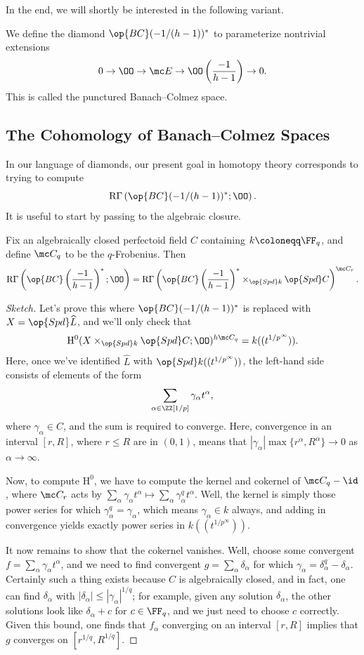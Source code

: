 \documentclass[../notes.tex]{subfiles}
\begin{document}
In the end, we will shortly be interested in the following variant.
\begin{notation}
	We define the diamond $\op{BC}(-1/(h-1))^*$ to parameterize nontrivial extensions
	\[0\to\OO\to\mc E\to\OO\left(\frac{-1}{h-1}\right)\to0.\]
	This is called the punctured Banach--Colmez space.
\end{notation}

\subsection{The Cohomology of Banach--Colmez Spaces}
In our language of diamonds, our present goal in homotopy theory corresponds to trying to compute
\[\mathrm R\Gamma\left(\op{BC}(-1/(h-1))^*;\OO\right).\]
It is useful to start by passing to the algebraic closure.
\begin{proposition} \label{prop:drinfeld}
	Fix an algebraically closed perfectoid field $C$ containing $k\coloneqq\FF_q$, and define $\mc C_q$ to be the $q$-Frobenius. Then
	\[\mathrm R\Gamma\left(\op{BC}\left(\frac{-1}{h-1}\right)^*;\OO\right)=\mathrm R\Gamma\left(\op{BC}\left(\frac{-1}{h-1}\right)^*\times_{\op{Spd}k}\op{Spd}C\right)^{\mc C_r}.\]
\end{proposition}
\begin{proof}[Sketch]
	Let's prove this where $\op{BC}(-1/(h-1))^*$ is replaced with $X=\op{Spd}\widehat L$, and we'll only check that
	\[\mathrm H^0(X\times_{\op{Spd}k}\op{Spd}C;\OO)^{h\mc C_q}=k((t^{1/p^\infty})).\]
	Here, once we've identified $\widehat L$ with $\op{Spd}k((t^{1/p^\infty}))$, the left-hand side consists of elements of the form
	\[\sum_{\alpha\in\ZZ[1/p]}\gamma_\alpha t^\alpha,\]
	where $\gamma_\alpha\in C$, and the sum is required to converge. Here, convergence in an interval $[r,R]$, where $r\le R$ are in $(0,1)$, means that $\left|\gamma_\alpha\right|\max\{r^\alpha,R^\alpha\}\to0$ as $\alpha\to\infty$.

	Now, to compute $\mathrm H^0$, we have to compute the kernel and cokernel of $\mc C_q-\id$, where $\mc C_r$ acts by $\sum_\alpha\gamma_\alpha t^\alpha\mapsto\sum_\alpha\gamma_\alpha^qt^\alpha$. Well, the kernel is simply those power series for which $\gamma_\alpha^q=\gamma_\alpha$, which means $\gamma_\alpha\in k$ always, and adding in convergence yields exactly power series in $k((t^{1/p^\infty}))$.

	It now remains to show that the cokernel vanishes. Well, choose some convergent $f=\sum_\alpha\gamma_\alpha t^\alpha$, and we need to find convergent $g=\sum_\alpha\delta_\alpha$ for which $\gamma_\alpha=\delta_\alpha^q-\delta_\alpha$. Certainly such a thing exists because $C$ is algebraically closed, and in fact, one can find $\delta_\alpha$ with $\left|\delta_\alpha\right|\le\left|\gamma_\alpha\right|^{1/q}$; for example, given any solution $\delta_\alpha$, the other solutions look like $\delta_\alpha+c$ for $c\in\FF_q$, and we just need to choose $c$ correctly. Given this bound, one finds that $f_\alpha$ converging on an interval $[r,R]$ implies that $g$ converges on $\left[r^{1/q},R^{1/q}\right]$.
\end{proof}
\end{document}
